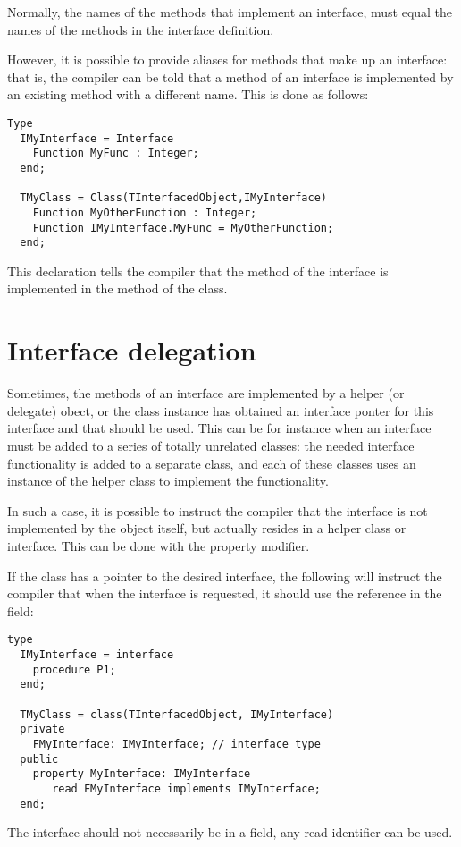 Normally, the names of the methods that implement an interface, must 
equal the names of the methods in the interface definition.

However, it is possible to provide aliases for methods that make up an
interface: that is, the compiler can be told that a method of an interface 
is implemented by an existing method with a different name. 
This is done as follows:
\begin{verbatim}
Type
  IMyInterface = Interface
    Function MyFunc : Integer;
  end;

  TMyClass = Class(TInterfacedObject,IMyInterface)
    Function MyOtherFunction : Integer;
    Function IMyInterface.MyFunc = MyOtherFunction;
  end;
\end{verbatim}
This declaration tells the compiler that the  method of
the  interface is implemented in the 
method of the  class.

\section{Interface delegation}
Sometimes, the methods of an interface are implemented by a helper (or
delegate) obect, or the class instance has obtained an interface ponter for
this interface and that should be used. This can be for instance when an
interface must be added to a series of totally unrelated classes: the needed
interface functionality is added to a separate class, and each of these
classes uses an instance of the helper class to implement the functionality.

In such a case, it is possible to instruct the compiler that the interface 
is not implemented by the object itself, but actually resides in a helper 
class or interface. This can be done with the  property modifier.

If the class has a pointer to the desired interface, the following will
instruct the compiler that when the  interface is
requested, it should use the reference in the field:
\begin{verbatim}
type
  IMyInterface = interface
    procedure P1;
  end;
 
  TMyClass = class(TInterfacedObject, IMyInterface)
  private
    FMyInterface: IMyInterface; // interface type
  public
    property MyInterface: IMyInterface 
       read FMyInterface implements IMyInterface;
  end;
\end{verbatim}
The interface should not necessarily be in a field, any read identifier can
be used. 

